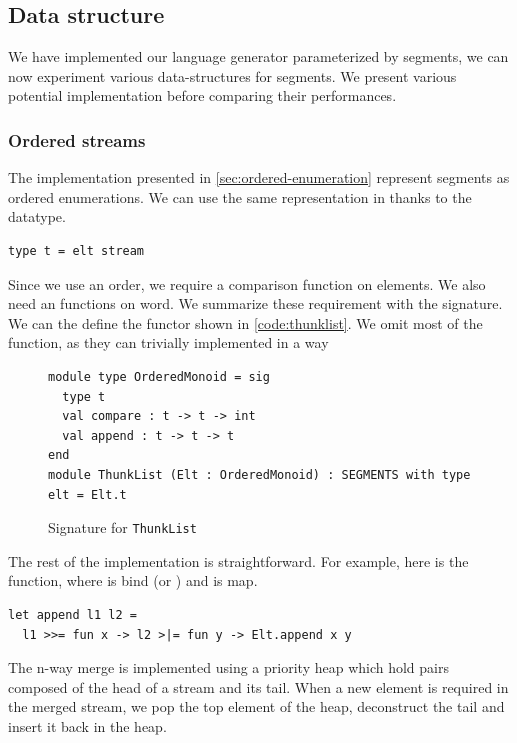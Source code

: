 \subsection{Data structure}

We have implemented our language generator parameterized by segments, we can now
experiment various data-structures for segments. We present various
potential implementation before comparing their performances.

\subsubsection{Ordered streams}

The \haskell implementation presented in \autoref{sec:ordered-enumeration}
represent segments as ordered enumerations. We can use
the same representation in \ocaml thanks to the  datatype.
\begin{lstlisting}[numbers=none]
type t = elt stream
\end{lstlisting}

Since we use an order, we require a comparison function on elements.
We also need an  functions on word. We summarize these requirement
with the  signature.
We can the define the  functor shown in \autoref{code:thunklist}.
We omit most of the function, as they can trivially implemented in a way

\begin{figure}
  \centering
\begin{lstlisting}
module type OrderedMonoid = sig
  type t
  val compare : t -> t -> int
  val append : t -> t -> t
end
module ThunkList (Elt : OrderedMonoid) : SEGMENTS with type elt = Elt.t
\end{lstlisting}
  \caption{Signature for \texttt{ThunkList}}
  \label{code:thunklist}
\end{figure}

The rest of the implementation is straightforward. For example, here is the
 function, where \code{>>=} is bind (or )
and \code{>|=} is map.

\begin{lstlisting}
let append l1 l2 =
  l1 >>= fun x -> l2 >|= fun y -> Elt.append x y
\end{lstlisting}

The n-way merge is implemented using a priority heap which hold pairs composed
of the head of a stream and its tail. When a new element is required in the
merged stream, we pop the top element of the heap, deconstruct
the tail and insert it back in the heap.

